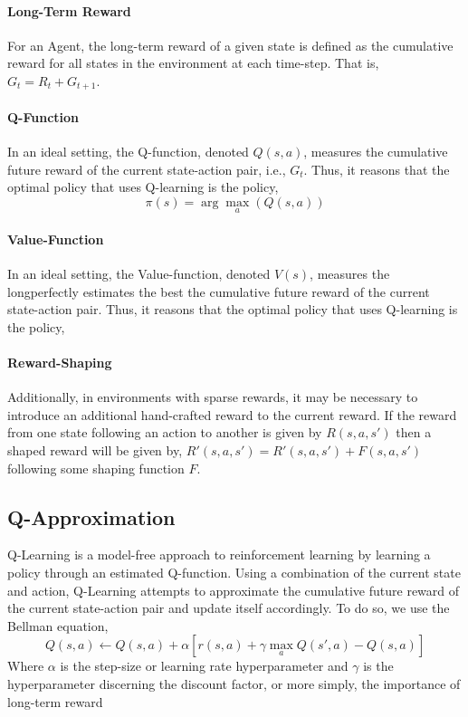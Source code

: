 \documentclass[../report.tex]{subfiles}
\begin{document}
\paragraph{Long-Term Reward}
For an Agent, the long-term reward of a given state is defined as the cumulative reward for all states in the environment at each time-step. That is, $G_t=R_t+G_{t+1}$.

\paragraph{Q-Function}
In an ideal setting, the Q-function, denoted $Q(s,a)$, measures the cumulative future reward of the current state-action pair, i.e., $G_t$. Thus, it reasons that the optimal policy that uses Q-learning is the policy,
\begin{equation}\label{eq:policy}
    \pi(s)=\arg\max\limits_{a}(Q(s,a))
\end{equation}

\paragraph{Value-Function}
In an ideal setting, the Value-function, denoted $V(s)$, measures the longperfectly estimates the best the cumulative future reward of the current state-action pair. Thus, it reasons that the optimal policy that uses Q-learning is the policy,

\paragraph{Reward-Shaping}
Additionally, in environments with sparse rewards, it may be necessary to introduce an additional hand-crafted reward to the current reward. If the reward from one state following an action to another is given by $R(s,a,s')$ then a shaped reward will be given by, $R'(s,a,s') = R'(s,a,s') + F(s,a,s')$ following some shaping function $F$.  


\subsection{Q-Approximation}\label{sec:q-approx}
Q-Learning is a model-free approach to reinforcement learning by learning a policy through an estimated Q-function. Using a combination of the current state and action, Q-Learning attempts to approximate the cumulative future reward of the current state-action pair and update itself accordingly. To do so, we use the Bellman equation,
\begin{equation}\label{eq:bellman_update}
    Q(s,a) \leftarrow Q(s,a) + \alpha [ r(s,a) + \gamma \max_a Q(s',a) - Q(s,a)]
\end{equation}
Where $\alpha$ is the step-size or learning rate hyperparameter and $\gamma$ is the hyperparameter discerning the discount factor, or more simply, the importance of long-term reward
\end{document}
